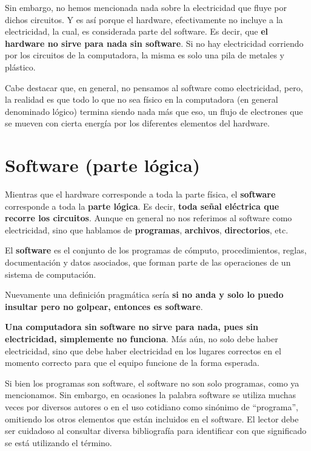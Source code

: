 Sin embargo, no hemos mencionada nada sobre la electricidad que fluye por dichos
circuitos. Y es así porque el hardware, efectivamente no incluye a la electricidad,
la cual, es considerada parte del software. Es decir, que \textbf{el hardware
no sirve para nada sin software}. Si no hay electricidad corriendo por los
circuitos de la computadora, la misma es solo una pila de metales y plástico.

Cabe destacar que, en general, no pensamos al software como electricidad, pero,
la realidad es que todo lo que no sea físico en la computadora (en general
denominado lógico) termina siendo nada más que eso, un flujo de electrones que
se mueven con cierta energía por los diferentes elementos del hardware.

\section{Software (parte lógica)}

Mientras que el hardware corresponde a toda la parte física, el \textbf{software}
corresponde a toda la \textbf{parte lógica}. Es decir, \textbf{toda señal
eléctrica que recorre los circuitos}. Aunque en general no nos referimos al
software como electricidad, sino que hablamos de \textbf{programas},
\textbf{archivos}, \textbf{directorios}, etc.

\begin{definition}
    El \textbf{software} es el conjunto de los programas de cómputo,
    procedimientos, reglas, documentación y datos asociados, que forman
    parte de las operaciones de un sistema de computación.\autocite[vid. p.13]{gookin_2005}
\end{definition}

Nuevamente una definición pragmática sería \textbf{si no anda y solo lo puedo
insultar pero no golpear, entonces es software}.

\textbf{Una computadora sin software no sirve para nada, pues sin electricidad,
simplemente no funciona}. Más aún, no solo debe haber electricidad, sino que
debe haber electricidad en los lugares correctos en el momento correcto para
que el equipo funcione de la forma esperada.

Si bien los programas son software, el software no son solo programas, como ya
mencionamos. Sin embargo, en ocasiones la palabra software se utiliza muchas
veces por diversos autores o en el uso cotidiano como sinónimo de ``programa'',
omitiendo los otros elementos que están incluidos en el software. El lector debe
ser cuidadoso al consultar diversa bibliografía para identificar con que
significado se está utilizando el término.


